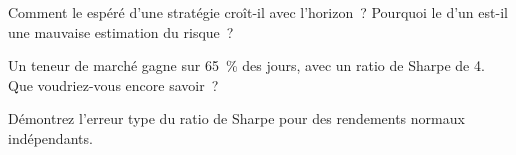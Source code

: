 \begin{interviewq}\label{iq:rs:performance-measurement:4}
Comment le  espéré d'une stratégie croît-il avec l'horizon~? Pourquoi le  d'un  est-il une mauvaise estimation du risque~?
\end{interviewq}

\begin{interviewq}\label{iq:rs:performance-measurement:5}
Un teneur de marché gagne sur 65~\% des jours, avec un ratio de Sharpe de 4. Que voudriez-vous encore savoir~?
\end{interviewq}

\begin{interviewq}\label{iq:rs:performance-measurement:6}
Démontrez l'erreur type du ratio de Sharpe pour des rendements normaux indépendants.
\end{interviewq}
